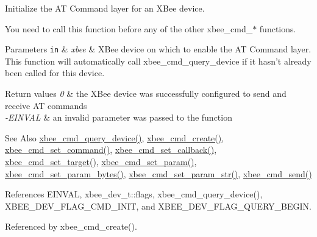 Initialize the A\-T Command layer for an X\-Bee device. 

You need to call this function before any of the other xbee\-\_\-cmd\-\_\-$\ast$ functions.


\begin{DoxyParams}[1]{Parameters}
\mbox{\tt in}  & {\em xbee} & X\-Bee device on which to enable the A\-T Command layer. This function will automatically call xbee\-\_\-cmd\-\_\-query\-\_\-device if it hasn't already been called for this device.\\
\hline
\end{DoxyParams}

\begin{DoxyRetVals}{Return values}
{\em 0} & the X\-Bee device was successfully configured to send and receive A\-T commands \\
\hline
{\em -\/\-E\-I\-N\-V\-A\-L} & an invalid parameter was passed to the function\\
\hline
\end{DoxyRetVals}
\begin{DoxySeeAlso}{See Also}
\hyperlink{group__xbee__atcmd_ga12317255ca84c2539b7d7a58816eccab}{xbee\-\_\-cmd\-\_\-query\-\_\-device()}, \hyperlink{group__xbee__atcmd_gab73aaf873be6f9e515dcd65748a7f21c}{xbee\-\_\-cmd\-\_\-create()}, \hyperlink{group__xbee__atcmd_ga06181e54a87d90c30108360d6b433323}{xbee\-\_\-cmd\-\_\-set\-\_\-command()}, \hyperlink{group__xbee__atcmd_ga0a5d2e2e87743061c46abd53e379e014}{xbee\-\_\-cmd\-\_\-set\-\_\-callback()}, \hyperlink{group__xbee__atcmd_gae478cb2ea9bb07ade86009a65e6d121f}{xbee\-\_\-cmd\-\_\-set\-\_\-target()}, \hyperlink{group__xbee__atcmd_ga4295dde3673b07f41e569e333abd9730}{xbee\-\_\-cmd\-\_\-set\-\_\-param()}, \hyperlink{group__xbee__atcmd_ga6bd558a2d03eafe29b176f598d76ffd6}{xbee\-\_\-cmd\-\_\-set\-\_\-param\-\_\-bytes()}, \hyperlink{group__xbee__atcmd_ga5b69459e7c47be384c9add2921e507e0}{xbee\-\_\-cmd\-\_\-set\-\_\-param\-\_\-str()}, \hyperlink{group__xbee__atcmd_ga2c58eedef60b41dd30ae1f6b475606a8}{xbee\-\_\-cmd\-\_\-send()} 
\end{DoxySeeAlso}


References E\-I\-N\-V\-A\-L, xbee\-\_\-dev\-\_\-t\-::flags, xbee\-\_\-cmd\-\_\-query\-\_\-device(), X\-B\-E\-E\-\_\-\-D\-E\-V\-\_\-\-F\-L\-A\-G\-\_\-\-C\-M\-D\-\_\-\-I\-N\-I\-T, and X\-B\-E\-E\-\_\-\-D\-E\-V\-\_\-\-F\-L\-A\-G\-\_\-\-Q\-U\-E\-R\-Y\-\_\-\-B\-E\-G\-I\-N.



Referenced by xbee\-\_\-cmd\-\_\-create().

